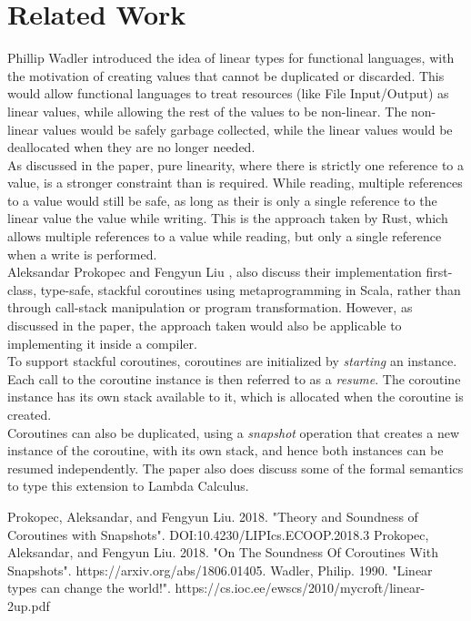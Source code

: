 \documentclass[publish, nobox]{acmconf}
\begin{document}
\section*{Related Work}
Phillip Wadler \cite{wadler} introduced the idea of linear types for functional languages, with the motivation of creating values that cannot be duplicated or discarded. This would allow functional languages to treat resources (like File Input/Output) as linear values, while allowing the rest of the values to be non-linear. The non-linear values would be safely garbage collected, while the linear values would be deallocated when they are no longer needed. \\
As discussed in the paper, pure linearity, where there is strictly one reference to a value, is a stronger constraint than is required. While reading, multiple references to a value would still be safe, as long as their is only a single reference to the linear value the value while writing. This is the approach taken by Rust, which allows multiple references to a value while reading, but only a single reference when a write is performed. \\
Aleksandar Prokopec and Fengyun Liu \cite{soundnes},\cite{snapshots2} also discuss their implementation first-class, type-safe, stackful coroutines using metaprogramming in Scala, rather than through call-stack manipulation or program transformation. However, as discussed in the paper, the approach taken would also be applicable to implementing it inside a compiler. \\
To support stackful coroutines, coroutines are initialized by \textit{starting} an instance. Each call to the coroutine instance is then referred to as a \textit{resume}. The coroutine instance has its own stack available to it, which is allocated when the coroutine is created. \\
Coroutines can also be duplicated, using a \textit{snapshot} operation that creates a new instance of the coroutine, with its own stack, and hence both instances can be resumed independently. The paper also does discuss some of the formal semantics to type this extension to Lambda Calculus.\\

\vfill\null
\begin{thebibliography}{9}
    Prokopec, Aleksandar, and Fengyun Liu. 2018. "Theory and Soundness of Coroutines with Snapshots". DOI:10.4230/LIPIcs.ECOOP.2018.3
    Prokopec, Aleksandar, and Fengyun Liu. 2018. "On The Soundness Of Coroutines With Snapshots". https://arxiv.org/abs/1806.01405.
    Wadler, Philip. 1990. "Linear types can change the world!". https://cs.ioc.ee/ewscs/2010/mycroft/linear-2up.pdf
\end{thebibliography}
\end{document}
